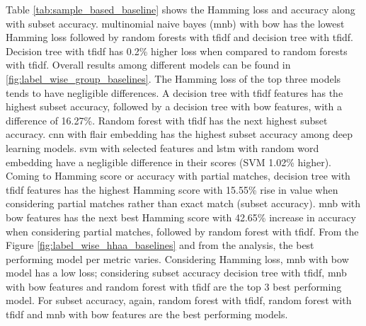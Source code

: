 Table \ref{tab:sample_based_baseline} shows the Hamming loss and accuracy along with subset accuracy. multinomial naive bayes (\acrshort{mnb}) with \acrshort{bow} has the lowest Hamming loss followed by random forests with \acrshort{tfidf} and decision tree with \acrshort{tfidf}. Decision tree with \acrshort{tfidf} has 0.2\% higher loss when compared to random forests with \acrshort{tfidf}. Overall results among different models can be found in \ref{fig:label_wise_group_baselines}. The Hamming loss of the top three models tends to have negligible differences. A decision tree with \acrshort{tfidf} features has the highest subset accuracy, followed by a decision tree with \acrshort{bow} features, with a difference of 16.27\%. Random forest with \acrshort{tfidf} has the next highest subset accuracy. \acrshort{cnn} with flair embedding has the highest subset accuracy among deep learning models. \acrshort{svm} with selected features and \acrshort{lstm} with random word embedding have a negligible difference in their scores (SVM 1.02\% higher).  Coming to Hamming score or accuracy with partial matches, decision tree with \acrshort{tfidf} features has the highest Hamming score with 15.55\% rise in value when considering partial matches rather than exact match (subset accuracy). \acrshort{mnb} with \acrshort{bow} features has the next best Hamming score with 42.65\% increase in accuracy when considering partial matches, followed by random forest with \acrshort{tfidf}. From the Figure \ref{fig:label_wise_hhaa_baselines} and from the analysis, the best performing model per metric varies. Considering Hamming loss, \acrlong{mnb} with \acrlong{bow} model has a low loss; considering subset accuracy decision tree with \acrshort{tfidf}, \acrshort{mnb} with \acrshort{bow} features and random forest with \acrshort{tfidf} are the top 3 best performing model. For subset accuracy, again, random forest with \acrshort{tfidf},  random forest with \acrshort{tfidf} and \acrshort{mnb} with \acrshort{bow} features are the best performing models.
